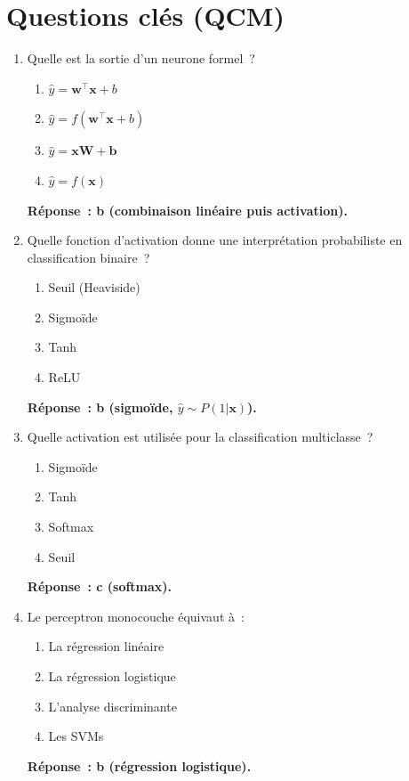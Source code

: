 \documentclass[a4paper,11pt]{article}
\theoremstyle{definition}
\theoremstyle{remark}
\begin{document}
\newpage
\section*{Questions cl\'es (QCM)}

\begin{enumerate}

  \item Quelle est la sortie d'un neurone formel~?
    \begin{enumerate}
      \item $\hat{y} = \mathbf{w}^\intercal \mathbf{x} + b$
      \item $\hat{y} = f(\mathbf{w}^\intercal \mathbf{x} + b)$
      \item $\hat{y} = \mathbf{x} \mathbf{W} + \mathbf{b}$
      \item $\hat{y} = f(\mathbf{x})$
    \end{enumerate}
    \textbf{R\'eponse~: b (combinaison lin\'eaire puis activation).}

  \item Quelle fonction d'activation donne une interpr\'etation
    probabiliste en classification binaire~?
    \begin{enumerate}
      \item Seuil (Heaviside)
      \item Sigmo\"ide
      \item Tanh
      \item ReLU
    \end{enumerate}
    \textbf{R\'eponse~: b (sigmo\"ide, $\hat{y} \sim P(1|\mathbf{x})$).}

  \item Quelle activation est utilis\'ee pour la classification
    multiclasse~?
    \begin{enumerate}
      \item Sigmo\"ide
      \item Tanh
      \item Softmax
      \item Seuil
    \end{enumerate}
    \textbf{R\'eponse~: c (softmax).}

  \item Le perceptron monocouche \'equivaut \`a~:
    \begin{enumerate}
      \item La r\'egression lin\'eaire
      \item La r\'egression logistique
      \item L'analyse discriminante
      \item Les SVMs
    \end{enumerate}
    \textbf{R\'eponse~: b (r\'egression logistique).}


\end{enumerate}
\end{document}
